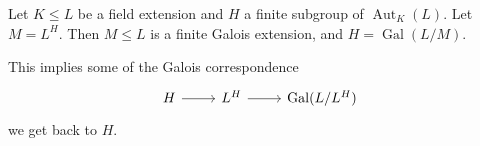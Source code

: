 \documentclass{article}
\DeclareMathOperator{\Aut}{Aut}
\DeclareMathOperator{\Gal}{Gal}
\begin{document}

\begin{nthm}\label{thm:3.3}
    Let $K \leq L$ be a field extension and $H$ a finite subgroup of $\Aut_K(L)$.
    Let $M = L^H$. Then $M \leq L$ is a finite Galois extension, and $H = \Gal(L/M)$.
\end{nthm}

\begin{remark}
    This implies some of the Galois correspondence
    \begin{equation*}
        \begin{tikzcd}
            H \arrow[r] & L^H \arrow[r] & \Gal(L / L^H)
        \end{tikzcd}
    \end{equation*}
    we get back to $H$.
\end{remark}
\end{document}

